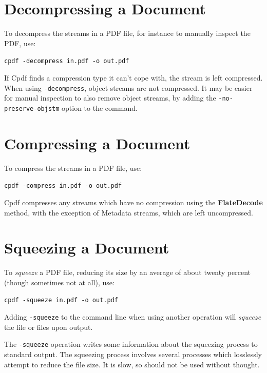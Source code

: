 \documentclass{book}
\begin{document}
  \section{Decompressing a Document}
  To decompress the streams in a PDF file, for instance to manually inspect the
PDF, use:

  \begin{framed}
   \noindent\small\verb!cpdf -decompress in.pdf -o out.pdf!
  \end{framed}

  \noindent If Cpdf finds a compression type it can't cope with, the stream is left compressed. When using \texttt{-decompress}, object streams are not compressed. It may be easier for manual inspection to also remove object streams, by adding the \texttt{-no-preserve-objstm} option to the command.
  \section{Compressing a Document}
  To compress the streams in a PDF file, use:

  \begin{framed}
    \noindent\small\verb!cpdf -compress in.pdf -o out.pdf!
  \end{framed}

  \noindent Cpdf compresses any streams which have no compression using the
  \textbf{Flate\-Decode} method, with the exception of Metadata streams, which
  are left uncompressed.
  
  \section{Squeezing a Document}
  To \textit{squeeze} a PDF file, reducing its size by an average of about twenty percent (though sometimes not at all), use:

  \begin{framed}
    \noindent\small\verb!cpdf -squeeze in.pdf -o out.pdf!
  \end{framed}

  \noindent Adding \texttt{-squeeze} to the command line when using another operation will \textit{squeeze} the file or files upon output.
  
  The \texttt{-squeeze} operation writes some information about the squeezing process to standard output. The squeezing process involves several processes which losslessly attempt to reduce the file size. It is slow, so should not be used without thought.
\end{document}
